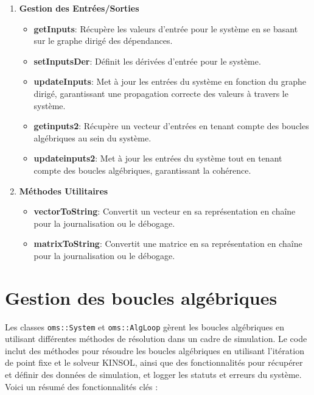 \begin{enumerate}
    \item \textbf{Gestion des Entrées/Sorties}
    \begin{itemize}
        \item \textbf{getInputs}: Récupère les valeurs d'entrée pour le système en se basant sur le graphe dirigé des dépendances.
        \item \textbf{setInputsDer}: Définit les dérivées d'entrée pour le système.
        \item \textbf{updateInputs}: Met à jour les entrées du système en fonction du graphe dirigé, garantissant une propagation correcte des valeurs à travers le système.
        \item \textbf{getinputs2}: Récupère un vecteur d'entrées en tenant compte des boucles algébriques au sein du système.
        \item \textbf{updateinputs2}: Met à jour les entrées du système tout en tenant compte des boucles algébriques, garantissant la cohérence.
    \end{itemize}

    \item \textbf{Méthodes Utilitaires}
    \begin{itemize}
        \item \textbf{vectorToString}: Convertit un vecteur en sa représentation en chaîne pour la journalisation ou le débogage.
        \item \textbf{matrixToString}: Convertit une matrice en sa représentation en chaîne pour la journalisation ou le débogage.
    \end{itemize}

\end{enumerate}



\section{Gestion des boucles algébriques}

Les classes \texttt{oms::System} et \texttt{oms::AlgLoop} gèrent les boucles algébriques en utilisant différentes méthodes de résolution dans un cadre de simulation. Le code inclut des méthodes pour résoudre les boucles algébriques en utilisant l'itération de point fixe et le solveur KINSOL, ainsi que des fonctionnalités pour récupérer et définir des données de simulation, et logger les statuts et erreurs du système. Voici un résumé des fonctionnalités clés :

